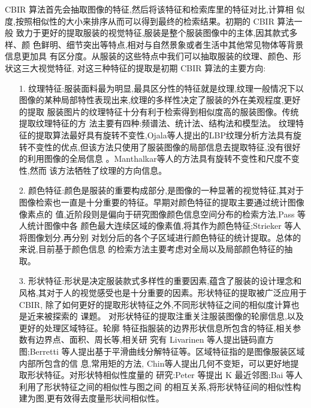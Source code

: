 CBIR 算法首先会抽取图像的特征,然后将该特征和检索库里的特征对比,计算相
似度,按照相似性的大小来排序从而可以得到最终的检索结果。初期的 CBIR 算法一般
致力于更好的提取服装的视觉特征,服装是整个服装图像中的主体,因其款式多样、颜
色鲜明、细节突出等特点,相对与自然景象或者生活中其他常见物体等背景信息更加具
有区分度。从服装的这些特点中我们可以抽取服装的纹理、颜色、形状这三大视觉特征,
对这三种特征的提取是初期 CBIR 算法的主要方向:
\begin{itemize}
\item[1.]纹理特征:服装面料最为明显,最具区分性的特征就是纹理,纹理一般情况下以
图像的某种局部特性表现出来,纹理的多样性决定了服装的外在美观程度,更好的提取
服装图片的纹理特征十分有利于检索得到相似度高的服装图像。传统提取纹理特征的方
法主要有四种:频谱法、统计法、结构法和模型法。
纹理特征的提取算法最好具有旋转不变性,Ojala等人提出的LBP纹理分析方法具有旋转不变性的优点,但该方法只使用了服装图像的局部信息去提取特征,没有很好
的利用图像的全局信息\cite{ojala2002multiresolution}
。Manthalkar等人的方法具有旋转不变性和尺度不变性,然而
该方法牺牲了纹理的方向信息\cite{manthalkar2003rotation}。

\item[2.] 颜色特征:颜色是服装的重要构成部分,是图像的一种显著的视觉特征,其对于
图像检索也一直是十分重要的特征。早期对颜色特征的提取主要通过统计图像像素点的
值,近阶段则是偏向于研究图像颜色信息空间分布的检索方法,Pass 等人统计图像中各
颜色最大连续区域的像素值,将其作为颜色特征\cite{pass1996comparing};Strieker 等人将图像划分,再分别
对划分后的各个子区域进行颜色特征的统计提取\cite{stricker1997spectral}。总体的来说,目前基于颜色信息
的检索方法主要考虑对全局以及局部颜色特征的抽取。

\item[3.] 形状特征:形状是决定服装款式多样性的重要因素,蕴含了服装的设计理念和
风格,其对于人的视觉感受也是十分重要的因素。形状特征的提取被广泛应用于 CBIR,
除了如何更好的提取形状特征之外,不同形状特征之间的相似度计算也是近来被探索的
课题。
对形状特征的提取注重关注服装图像的轮廓信息,以及更好的处理区域特征。轮廓
特征指服装的边界形状信息所包含的特征,相关参数有边界点、面积、周长等,相关研
究有 Livarinen 等人提出链码直方图\cite{iivarinen1997comparison};Berretti
等人提出基于平滑曲线分解特征等\cite{berretti2000retrieval}。区域特征指的是图像服装区域内部所包含的信
息,常用矩的方法, Chin等人提出几何不变矩，可以更好地提取形状特征\cite{teh1988image}。对形状特相似性度量的
研究:Peter 等提出 K 最近邻图\cite{kontschieder2009beyond};Bai 等人利用了形状特征之间的相似性与图之间
的相互关系,将形状特征间的相似性构建为图,更有效得去度量形状间相似性\cite{bai2010learning}。
\end{itemize}

